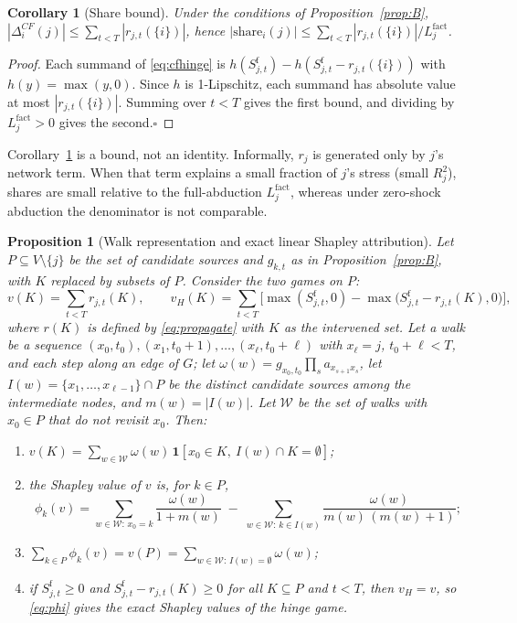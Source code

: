 \documentclass[referee,pdflatex,sn-mathphys-ay]{sn-jnl}
\theoremstyle{thmstyleone}%
\newtheorem{proposition}[theorem]{Proposition}%
\newtheorem{corollary}{Corollary}%
\theoremstyle{thmstyletwo}%
\theoremstyle{thmstylethree}%
\begin{document}
\begin{corollary}[Share bound]
\label{cor:share}
Under the conditions of Proposition~\ref{prop:B}, $|\Delta_i^{CF}(j)|\le\sum_{t<T}|r_{j,t}(\{i\})|$, hence
$|\mathrm{share}_i(j)|\le \sum_{t<T}|r_{j,t}(\{i\})|/L_j^{\mathrm{fact}}$.
\end{corollary}
\begin{proof}
Each summand of \eqref{eq:cfhinge} is $h(S^{\mathrm f}_{j,t})-h(S^{\mathrm f}_{j,t}-r_{j,t}(\{i\}))$ with $h(y)=\max(y,0)$.
Since $h$ is 1-Lipschitz, each summand has absolute value at most $|r_{j,t}(\{i\})|$. Summing over $t<T$
gives the first bound, and dividing by $L_j^{\mathrm{fact}}>0$ gives the second.\hfill$\square$
\end{proof}

Corollary~\ref{cor:share} is a bound, not an identity. Informally, $r_j$ is generated only by $j$'s
network term. When that term explains a small fraction of $j$'s stress (small $R^2_j$), shares are small
relative to the full-abduction $L_j^{\mathrm{fact}}$, whereas under zero-shock abduction the
denominator is not comparable.

\begin{proposition}[Walk representation and exact linear Shapley attribution]
\label{prop:C}
Let $P\subseteq V\setminus\{j\}$ be the set of candidate sources and $g_{k,t}$ as in
Proposition~\ref{prop:B}, with $K$ replaced by subsets of $P$. Consider the two games
on $P$:
\[
v(K)=\sum_{t<T} r_{j,t}(K),
\qquad
v_H(K)=\sum_{t<T}\Big[\max(S^{\mathrm f}_{j,t},0)-\max\big(S^{\mathrm f}_{j,t}-r_{j,t}(K),0\big)\Big],
\]
where $r(K)$ is defined by \eqref{eq:propagate} with $K$ as the intervened set. Let a
\emph{walk} be a sequence $(x_0,t_0),(x_1,t_0+1),\dots,(x_\ell,t_0+\ell)$ with
$x_\ell=j$, $t_0+\ell<T$, and each step along an edge of $G$; let $\omega(w)=g_{x_0,t_0}\prod_{s}a_{x_{s+1}x_s}$, let
$I(w)=\{x_1,\dots,x_{\ell-1}\}\cap P$ be the distinct candidate sources among the
intermediate nodes, and $m(w)=|I(w)|$. Let $\mathcal{W}$ be the set of walks with
$x_0\in P$ that do not revisit $x_0$. Then:
\begin{enumerate}[label=(\alph*),leftmargin=*]
\item $v(K)=\sum_{w\in\mathcal W}\omega(w)\,\mathbf 1[x_0\in K,\ I(w)\cap K=\emptyset]$;
\item the Shapley value of $v$ is, for $k\in P$,
\begin{equation}
\label{eq:phi}
\phi_k(v)=\sum_{w\in\mathcal W:\,x_0=k}\frac{\omega(w)}{1+m(w)}
\;-\;\sum_{w\in\mathcal W:\,k\in I(w)}\frac{\omega(w)}{m(w)\,(m(w)+1)};
\end{equation}
\item $\sum_{k\in P}\phi_k(v)=v(P)=\sum_{w\in\mathcal W:\,I(w)=\emptyset}\omega(w)$;
\item if $S^{\mathrm f}_{j,t}\ge0$ and $S^{\mathrm f}_{j,t}-r_{j,t}(K)\ge0$ for all $K\subseteq P$
and $t<T$, then $v_H=v$, so \eqref{eq:phi} gives the exact Shapley values of the hinge game.
\end{enumerate}
\end{proposition}
\end{document}

